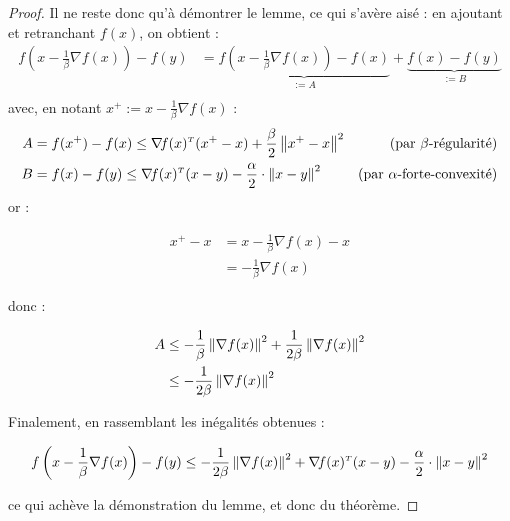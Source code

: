 \documentclass[11pt]{article}
\newcommand{\transpose}[1]{\ensuremath{#1^{\scriptscriptstyle T}}}
\newcommand{\dotpourvariable}{\:\cdot\:}
\newcommand{\ifempty}[3]{\ifx\hfuzz#1\hfuzz #2 \else #3\fi}
\newcommand{\norme}[1]{\left\lVert\ifempty{#1}{\dotpourvariable}{#1}\right\rVert}
\begin{document}
\begin{proof}
Il ne reste donc qu'à démontrer le lemme, ce qui s'avère aisé : en ajoutant et retranchant $f(x)$, on obtient :
\begin{align*}
  f\left(x - \frac{1}{\beta}\nabla f(x)\right)-f(y) &= \underbrace{f\left(x - \frac{1}{\beta}\nabla f(x)\right)-f(x)}_{:=A}+
  \underbrace{f(x)-f(y)}_{:=B}\\
  \end{align*}
  avec, en notant $x^{+} := x - \frac{1}{\beta}\nabla f(x)$ :
  \begin{align*}
    A &= f(x^+) - f(x) \leq \transpose{\nabla\! f(x)}(x^+-x)+ \frac{\beta}{2} \norme{x^+-x}^2 & \text{(par $\beta$-régularité)} \\
    B &= f(x) - f(y) \leq \transpose{\nabla\! f(x)}(x-y)-\frac{\alpha}{2} \cdot \norme{x-y}^2 & \text{(par $\alpha$-forte-convexité)} \\
  \end{align*}
or :

  \begin{align*}
  x^+ - x &= x - \frac{1}{\beta}\nabla f(x) - x \\
  &=  - \frac{1}{\beta}\nabla f(x)
  \end{align*}

donc :

  \begin{align*}
  A &\leq -\frac{1}{\beta}\norme{\nabla f(x)}^2 + \frac{1}{2\beta}\norme{\nabla f(x)}^2 \\
  & \leq -\frac{1}{2\beta}\norme{\nabla f(x)}^2
  \end{align*}

Finalement, en rassemblant les inégalités obtenues :

\begin{align*}
  f\left(x - \frac{1}{\beta}\nabla f(x)\right)-f(y) & \leq -\frac{1}{2\beta}\norme{\nabla f(x)}^2 + \transpose{\nabla\! f(x)}(x-y)-\frac{\alpha}{2} \cdot \norme{x-y}^2 \\
\end{align*}

ce qui achève la démonstration du lemme, et donc du théorème.

  \end{proof}
\end{document}
